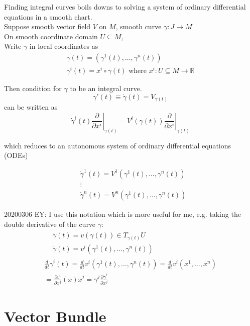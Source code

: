 \documentclass[10pt]{amsart}
\begin{document}
\begin{multicols*}{2}
Finding integral curves boils downs to solving a system of ordinary differential equations in a smooth chart. \\
Suppose smooth vector field $V$ on $M$, smooth curve $\gamma : J \to M$ \\
On smooth coordinate domain $U \subseteq M$, \\
Write $\gamma$ in local coordinates as 
\[
\begin{gathered}
	\gamma(t) = (\gamma^{1}(t), \dots , \gamma^{n}(t)) \\
	\gamma^i(t) = x^i \circ \gamma(t) \text{ where } x^i : U \subseteq M \to \mathbb{R} 
\end{gathered}
\]

Then condition for $\gamma$ to be an integral curve.
\[
\gamma'(t) \equiv \dot{\gamma}(t) = V_{\gamma(t)}
\]
can be written as 
\[
\dot{\gamma}^i(t) \left. \frac{\partial}{\partial x^i} \right|_{\gamma(t)} = V^i(\gamma(t)) \left. \frac{\partial }{ \partial x^i } \right|_{\gamma(t)}
\]

which reduces to an autonomous system of ordinary differential equations (ODEs)

\begin{equation}
\begin{aligned} 
& \dot{\gamma}^1(t) = V^1(\gamma^1(t), \dots, \gamma^n(t)) \\ 
& \vdots \\ 
& \dot{\gamma}^n(t) = V^n(\gamma^1(t), \dots , \gamma^n(t))
\end{aligned} 
\end{equation}

20200306 EY: I use this notation which is more useful for me, e.g. taking the double derivative of the curve $\gamma$: 
\[
\begin{gathered} 
\begin{aligned} 
& \dot{\gamma}(t) = v(\gamma(t)) \in T_{\gamma(t)}U \\ 
& \dot{\gamma}(t) = v^i(\gamma^1(t), \dots, \gamma^n(t))
\end{aligned} \\ 
\frac{d}{dt} \dot{\gamma}^i(t) = \frac{d}{dt} v^i(\gamma^1(t), \dots , \gamma^n(t)) = \frac{d}{dt} v^i(x^1 , \dots , x^n) \\
= \frac{\partial v^i}{\partial x^j}(x) \dot{x}^j = \dot{\gamma}^j \frac{\partial \dot{\gamma}^i}{\partial x^j}
\end{gathered} 
\]

\section{Vector Bundle}


\end{multicols*}
\end{document}
